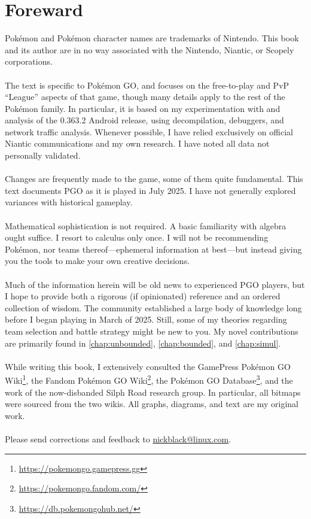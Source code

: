 \clearpage
\chapter{Foreward}

\noindent{}Pokémon and Pokémon character names are trademarks of Nintendo.
This book and its author are in no way associated with the Nintendo, Niantic,
  or Scopely corporations.\\
\\
\noindent{}The text is specific to Pokémon GO, and focuses on the free-to-play and PvP
  ``League'' aspects of that game, though many details
  apply to the rest of the Pokémon family.
In particular, it is based on my experimentation with and analysis of
 the 0.363.2 Android release, using decompilation, debuggers, and
 network traffic analysis.
Whenever possible, I have relied exclusively on official Niantic communications
 and my own research.
I have noted all data not personally validated.\\
\\
\noindent{}Changes are frequently made to the game, some of them quite fundamental.
This text documents PGO as it is played in July 2025.
I have not generally explored variances with historical gameplay.\\
\\
\noindent{}Mathematical sophistication is not required.
A basic familiarity with algebra ought suffice.
I resort to calculus only once.
I will not be recommending Pokémon, nor teams thereof---ephemeral information at best---but
 instead giving you the tools to make your own creative decisions.\\
\\
\noindent{}Much of the information herein will be old news to experienced
 PGO players, but I hope to provide both a rigorous (if opinionated) reference and an ordered collection of wisdom.
The community established a large body of knowledge long before I
 began playing in March of 2025.
Still, some of my theories regarding team selection and battle strategy might
  be new to you.
My novel contributions are primarily found in \autoref{chap:unbounded},
  \autoref{chap:bounded}, and \autoref{chap:simul}.\\
\\
\noindent{}While writing this book, I extensively consulted the
  GamePress Pokémon GO Wiki\footnote{\url{https://pokemongo.gamepress.gg}},
  the Fandom Pokémon GO Wiki\footnote{\url{https://pokemongo.fandom.com/}},
  the Pokémon GO Database\footnote{\url{https://db.pokemongohub.net/}},
  and the work of the now-disbanded Silph Road research group.
In particular, all bitmaps were sourced from the two wikis.
All graphs, diagrams, and text are my original work.\\
\\
\noindent{}Please send corrections and feedback to 
  \href{mailto:nickblack@linux.com}{nickblack@linux.com}.
\mainmatter

